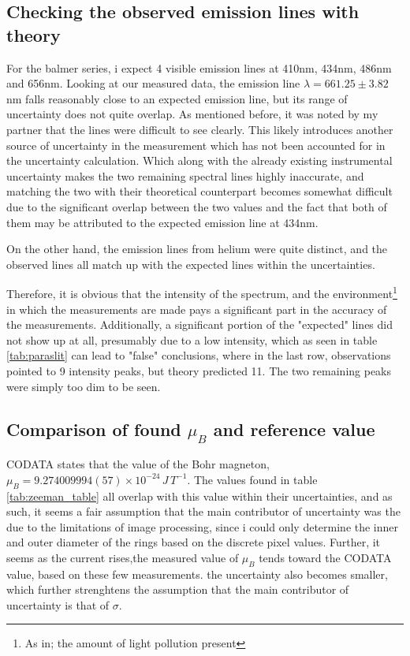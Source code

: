 \documentclass[11pt,a4paper]{article}
\begin{document}
  \subsection{Checking the observed emission lines with theory}
    For the balmer series, i expect 4 visible emission lines at 410nm, 434nm, 486nm and 656nm. Looking at our measured data, the emission line $\lambda = 661.25\pm 3.82\,$nm falls reasonably close to an expected emission line, but its range of uncertainty does not quite overlap. As mentioned before, it was noted by my partner that the lines were difficult to see clearly. This likely introduces another source of uncertainty in the measurement which has not been accounted for in the uncertainty calculation. Which along with the already existing instrumental uncertainty makes the two remaining spectral lines highly inaccurate, and matching the two with their theoretical counterpart becomes somewhat difficult due to the significant overlap between the two values and the fact that both of them may be attributed to the expected emission line at 434nm.

    On the other hand, the emission lines from helium were quite distinct, and the observed lines all match up with the expected lines within the uncertainties.

    Therefore, it is obvious that the intensity of the spectrum, and the environment\footnote{As in; the amount of light pollution present} in which the measurements are made pays a significant part in the accuracy of the measurements. Additionally, a significant portion of the "expected" lines did not show up at all, presumably due to a low intensity, which as seen in table \ref{tab:paraslit} can lead to "false" conclusions, where in the last row, observations pointed to 9 intensity peaks, but theory predicted 11. The two remaining peaks were simply too dim to be seen.

  \subsection{Comparison of found $\mu_B$ and reference value}
    CODATA states that the value of the Bohr magneton, $\mu_B = 9.274 009 994(57)\times10^{-24}\,J\,T^{-1}$. The values found in table \ref{tab:zeeman_table} all overlap with this value within their uncertainties, and as such, it seems a fair assumption that the main contributor of uncertainty was the due to the limitations of image processing, since i could only determine the inner and outer diameter of the rings based on the discrete pixel values. Further, it seems as the current rises,the measured value of $\mu_B$ tends toward the CODATA value, based on these few measurements. the uncertainty also becomes smaller, which further strenghtens the assumption that the main contributor of uncertainty is that of $\sigma$.
\end{document}
